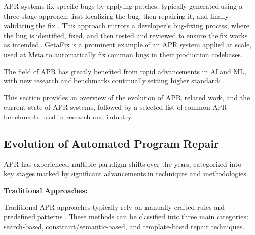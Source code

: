 APR systems fix specific bugs by applying patches, typically generated using a three-stage approach: first localizing the bug, then repairing it, and finally validating the fix \cite{zhangSurveyLearningbasedAutomated2024, baderGetafixLearningFix2019}. This approach mirrors a developer's bug-fixing process, where the bug is identified, fixed, and then tested and reviewed to ensure the fix works as intended \cite{yangSWEagentAgentComputerInterfaces2024}. GetaFix \cite{baderGetafixLearningFix2019} is a prominent example of an APR system applied at scale, used at Meta to automatically fix common bugs in their production codebases.

The field of APR has greatly benefited from rapid advancements in AI and ML, with new research and benchmarks continually setting higher standards \cite{puvvadiCodingAgentsComprehensive2025, houLargeLanguageModels2024}.

This section provides an overview of the evolution of APR, related work, and the current state of APR systems, followed by a selected list of common APR benchmarks used in research and industry.

\subsection{Evolution of Automated Program Repair} \label{subsection:evolution-apr}

\ac{APR} has experienced multiple paradigm shifts over the years, categorized into key stages marked by significant advancements in techniques and methodologies.

\textbf{Traditional Approaches:}

Traditional APR approaches typically rely on manually crafted rules and predefined patterns \cite{liuMarsCodeAgentAInative2024, xiaAutomatedProgramRepair2023, yinThinkRepairSelfDirectedAutomated2024}. These methods can be classified into three main categories: search-based, constraint/semantic-based, and template-based repair techniques.

